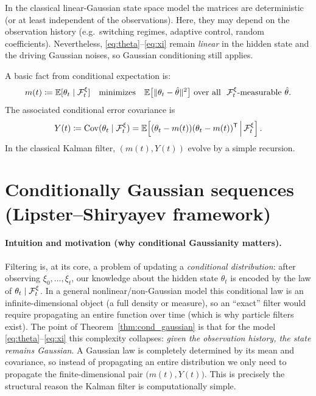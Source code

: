 \begin{remark}
In the classical linear-Gaussian state space model the matrices are deterministic (or at least independent of the observations).
Here, they may depend on the observation history (e.g.\ switching regimes, adaptive control, random coefficients).
Nevertheless, \eqref{eq:theta}--\eqref{eq:xi} remain \emph{linear} in the hidden state and the driving Gaussian noises,
so Gaussian conditioning still applies.
\end{remark}

\begin{remark}
A basic fact from conditional expectation is:
\[
m(t)\coloneqq \mathbb{E}[\theta_t\mid \mathcal{F}_t^\xi]
\quad\text{minimizes}\quad
\mathbb{E}\bigl[\|\theta_t-\hat\theta\|^2\bigr]
\ \text{over all }\ \mathcal{F}_t^\xi\text{-measurable }\hat\theta.
\]
The associated conditional error covariance is
\[
Y(t)\coloneqq \mathrm{Cov}(\theta_t\mid \mathcal{F}_t^\xi)
= \mathbb{E}\!\left[(\theta_t-m(t))(\theta_t-m(t))^{\mathsf{T}}\,\middle|\,\mathcal{F}_t^\xi\right].
\]
In the classical Kalman filter, \((m(t),Y(t))\) evolve by a simple recursion.
\end{remark}


\section{Conditionally Gaussian sequences (Lipster--Shiryayev framework)}

\paragraph{Intuition and motivation (why conditional Gaussianity matters).}
Filtering is, at its core, a problem of updating a \emph{conditional distribution}:
after observing \(\xi_0,\dots,\xi_t\), our knowledge about the hidden state \(\theta_t\) is encoded by the law of
\(\theta_t\mid \mathcal{F}_t^\xi\).
In a general nonlinear/non-Gaussian model this conditional law is an infinite-dimensional object (a full density or measure),
so an ``exact'' filter would require propagating an entire function over time (which is why particle filters exist).
The point of Theorem~\ref{thm:cond_gaussian} is that for the model \eqref{eq:theta}--\eqref{eq:xi} this complexity collapses:
\emph{given the observation history, the state remains Gaussian}.
A Gaussian law is completely determined by its mean and covariance, so instead of propagating an entire distribution we only
need to propagate the finite-dimensional pair \(\bigl(m(t),Y(t)\bigr)\).
This is precisely the structural reason the Kalman filter is computationally simple.

